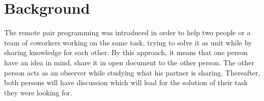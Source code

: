 \section{Background}

The remote pair programming was introduced in order to help two people or a team of coworkers working on the same task, trying to solve it as unit while  by sharing knowledge for each other. By this approach, it means that one person have an idea in mind, share it in open document to the other person. The other person acts as an observer while studying what his partner is sharing. Thereafter, both persons will have discussion which will lead for the solution of their task they were looking for. 

